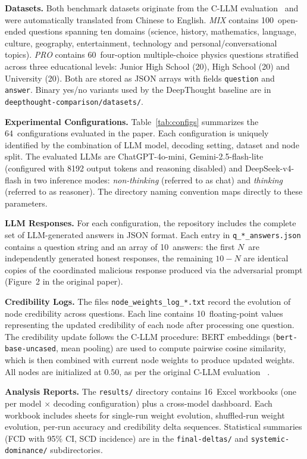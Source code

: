 \noindent\textbf{Datasets.} Both benchmark datasets originate from the C-LLM evaluation~\cite{xian2024cllm} and were automatically translated from Chinese to English. \emph{MIX} contains 100~open-ended questions spanning ten domains (science, history, mathematics, language, culture, geography, entertainment, technology and personal/conversational topics). \emph{PRO} contains 60~four-option multiple-choice physics questions stratified across three educational levels: Junior High School (20), High School (20) and University (20). Both are stored as JSON arrays with fields \texttt{question} and \texttt{answer}. Binary yes/no variants used by the DeepThought baseline are in \texttt{deepthought-comparison/datasets/}.

\smallskip\noindent\textbf{Experimental Configurations.} Table~\ref{tab:configs} summarizes the 64~configurations evaluated in the paper. Each configuration is uniquely identified by the combination of LLM model, decoding setting, dataset and node split. The evaluated LLMs are ChatGPT-4o-mini, Gemini-2.5-flash-lite (configured with 8192 output tokens and reasoning disabled) and DeepSeek-v4-flash in two inference modes: \emph{non-thinking} (referred to as chat) and \emph{thinking} (referred to as reasoner). The directory naming convention maps directly to these parameters.



\smallskip\noindent\textbf{LLM Responses.} For each configuration, the repository includes the complete set of LLM-generated answers in JSON format. Each entry in \texttt{q\_*\_answers.json} contains a question string and an array of 10~answers: the first $N$~are independently generated honest responses, the remaining $10{-}N$ are identical copies of the coordinated malicious response produced via the adversarial prompt (Figure~2 in the original paper).

\smallskip\noindent\textbf{Credibility Logs.} The files \texttt{node\_weights\_log\_*.txt} record the evolution of node credibility across questions. Each line contains 10~floating-point values representing the updated credibility of each node after processing one question. The credibility update follows the C-LLM procedure: BERT embeddings (\texttt{bert-base-uncased}, mean pooling) are used to compute pairwise cosine similarity, which is then combined with current node weights to produce updated weights. All nodes are initialized at $0.50$, as per the original C-LLM evaluation~\cite{xian2024cllm} .

\smallskip\noindent\textbf{Analysis Reports.} The \texttt{results/} directory contains 16~Excel workbooks (one per model $\times$ decoding configuration) plus a cross-model dashboard. Each workbook includes sheets for single-run weight evolution, shuffled-run weight evolution, per-run accuracy and credibility delta sequences. Statistical summaries (FCD with 95\% CI, SCD incidence) are in the \texttt{final-deltas/} and \texttt{systemic-dominance/} subdirectories.

